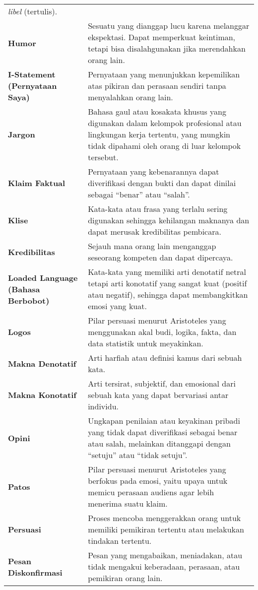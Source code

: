 \documentclass[
  letterpaper,
  DIV=11,
  numbers=noendperiod]{scrreprt}
\begin{document}
\begin{longtable}[]{@{}
  >{\raggedright\arraybackslash}p{}
  >{\raggedright\arraybackslash}p{}@{}}
\emph{libel} (tertulis). \\
\textbf{Humor} & Sesuatu yang dianggap lucu karena melanggar ekspektasi.
Dapat memperkuat keintiman, tetapi bisa disalahgunakan jika merendahkan
orang lain. \\
\textbf{I-Statement (Pernyataan Saya)} & Pernyataan yang menunjukkan
kepemilikan atas pikiran dan perasaan sendiri tanpa menyalahkan orang
lain. \\
\textbf{Jargon} & Bahasa gaul atau kosakata khusus yang digunakan dalam
kelompok profesional atau lingkungan kerja tertentu, yang mungkin tidak
dipahami oleh orang di luar kelompok tersebut. \\
\textbf{Klaim Faktual} & Pernyataan yang kebenarannya dapat diverifikasi
dengan bukti dan dapat dinilai sebagai ``benar'' atau ``salah''. \\
\textbf{Klise} & Kata-kata atau frasa yang terlalu sering digunakan
sehingga kehilangan maknanya dan dapat merusak kredibilitas
pembicara. \\
\textbf{Kredibilitas} & Sejauh mana orang lain menganggap seseorang
kompeten dan dapat dipercaya. \\
\textbf{Loaded Language (Bahasa Berbobot)} & Kata-kata yang memiliki
arti denotatif netral tetapi arti konotatif yang sangat kuat (positif
atau negatif), sehingga dapat membangkitkan emosi yang kuat. \\
\textbf{Logos} & Pilar persuasi menurut Aristoteles yang menggunakan
akal budi, logika, fakta, dan data statistik untuk meyakinkan. \\
\textbf{Makna Denotatif} & Arti harfiah atau definisi kamus dari sebuah
kata. \\
\textbf{Makna Konotatif} & Arti tersirat, subjektif, dan emosional dari
sebuah kata yang dapat bervariasi antar individu. \\
\textbf{Opini} & Ungkapan penilaian atau keyakinan pribadi yang tidak
dapat diverifikasi sebagai benar atau salah, melainkan ditanggapi dengan
``setuju'' atau ``tidak setuju''. \\
\textbf{Patos} & Pilar persuasi menurut Aristoteles yang berfokus pada
emosi, yaitu upaya untuk memicu perasaan audiens agar lebih menerima
suatu klaim. \\
\textbf{Persuasi} & Proses mencoba menggerakkan orang untuk memiliki
pemikiran tertentu atau melakukan tindakan tertentu. \\
\textbf{Pesan Diskonfirmasi} & Pesan yang mengabaikan, meniadakan, atau
tidak mengakui keberadaan, perasaan, atau pemikiran orang lain. \\

\end{longtable}
\end{document}
